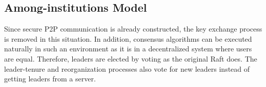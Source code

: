 \subsection{Among-institutions Model}
Since secure P2P communication is already constructed, the key exchange process is removed in this situation. In addition, consensus algorithms can be executed naturally in such an environment as it is in a decentralized system where users are equal. Therefore, leaders are elected by voting as the original Raft does. The leader-tenure and reorganization processes also vote for new leaders instead of getting leaders from a server.